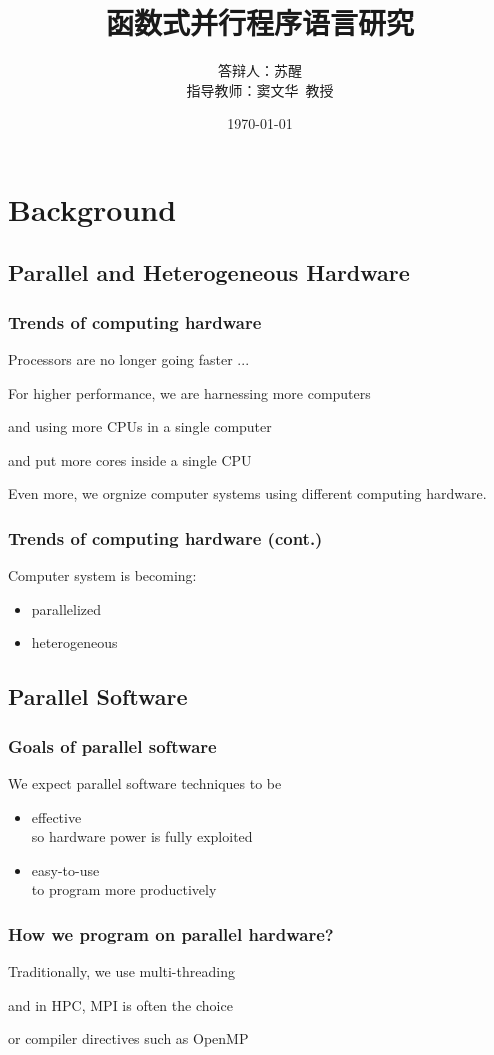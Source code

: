 \documentclass{beamer}
\title{函数式并行程序语言研究}
\author[苏醒~pysuxing@gmail.com]{
\begin{tabular}{ll}
答辩人： & 苏醒 \\
指导教师： & 窦文华~教授
\end{tabular}
}
\institute{计算机所641教研室}
\date{\today}
\begin{document}
\setlength{\parindent}{0pt}

\section{Background}

\subsection{Parallel and Heterogeneous Hardware}
\begin{frame}
  \frametitle{Trends of computing hardware}
  Processors are no longer going faster ...

  For higher performance, we are harnessing more computers %

  and using more CPUs in a single computer %

  and put more cores inside a single CPU %

  Even more, we orgnize computer systems using different computing hardware.

\end{frame}

\begin{frame}
  \frametitle{Trends of computing hardware (cont.)}
  Computer system is becoming:
  \begin{itemize}
    \item parallelized
    \item heterogeneous
  \end{itemize}
\end{frame}

\subsection{Parallel Software}
\begin{frame}
  \frametitle{Goals of parallel software}
  We expect parallel software techniques to be
  \begin{itemize}
    \item effective\\
      so hardware power is fully exploited
    \item easy-to-use\\
      to program more productively
  \end{itemize}
\end{frame}

\begin{frame}
  \frametitle{How we program on parallel hardware?}
  Traditionally, we use multi-threading %

  and in HPC, MPI is often the choice %

  or compiler directives such as OpenMP %
\end{frame}
\end{document}
